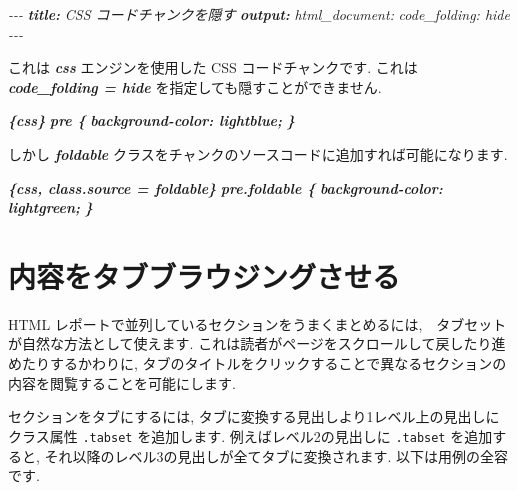 \documentclass[
  11pt,
  lualatex,ja=standard,jafont=noto]{bxjsreport}
\newenvironment{Shaded}{\begin{snugshade}}{\end{snugshade}}
\newcommand{\AnnotationTok}[1]{\textcolor[rgb]{0.56,0.35,0.01}{\textbf{\textit{#1}}}}
\newcommand{\CommentTok}[1]{\textcolor[rgb]{0.56,0.35,0.01}{\textit{#1}}}
\newcommand{\InformationTok}[1]{\textcolor[rgb]{0.56,0.35,0.01}{\textbf{\textit{#1}}}}
\newcommand{\NormalTok}[1]{#1}
\begin{document}
\begin{Shaded}
\begin{Highlighting}[]
\CommentTok{{-}{-}{-}}
\AnnotationTok{title:}\CommentTok{ CSS コードチャンクを隠す}
\AnnotationTok{output:}\CommentTok{ }
\CommentTok{  html\_document:}
\CommentTok{    code\_folding: hide}
\CommentTok{{-}{-}{-}}

\NormalTok{これは }\InformationTok{\textasciigrave{}css\textasciigrave{}}\NormalTok{ エンジンを使用した CSS コードチャンクです. これは }\InformationTok{\textasciigrave{}code\_folding = \textquotesingle{}hide\textquotesingle{}\textasciigrave{}}\NormalTok{ を指定しても隠すことができません.}

\InformationTok{\textasciigrave{}\textasciigrave{}\textasciigrave{}\{css\}}
\InformationTok{pre \{}
\InformationTok{  background{-}color: lightblue;}
\InformationTok{\}}
\InformationTok{\textasciigrave{}\textasciigrave{}\textasciigrave{}}

\NormalTok{しかし }\InformationTok{\textasciigrave{}foldable\textasciigrave{}}\NormalTok{ クラスをチャンクのソースコードに追加すれば可能になります.}

\InformationTok{\textasciigrave{}\textasciigrave{}\textasciigrave{}\{css, class.source = \textquotesingle{}foldable\textquotesingle{}\}}
\InformationTok{pre.foldable \{}
\InformationTok{  background{-}color: lightgreen;}
\InformationTok{\}}
\InformationTok{\textasciigrave{}\textasciigrave{}\textasciigrave{}}
\end{Highlighting}
\end{Shaded}

\hypertarget{html-tabs}{%
\section{内容をタブブラウジングさせる}\label{html-tabs}}

HTML レポートで並列しているセクションをうまくまとめるには,　タブセットが自然な方法として使えます. これは読者がページをスクロールして戻したり進めたりするかわりに, タブのタイトルをクリックすることで異なるセクションの内容を閲覧することを可能にします.

セクションをタブにするには, タブに変換する見出しより1レベル上の見出しにクラス属性 \texttt{.tabset} を追加します. 例えばレベル2の見出しに \texttt{.tabset} を追加すると, それ以降のレベル3の見出しが全てタブに変換されます. 以下は用例の全容です.
\end{document}

